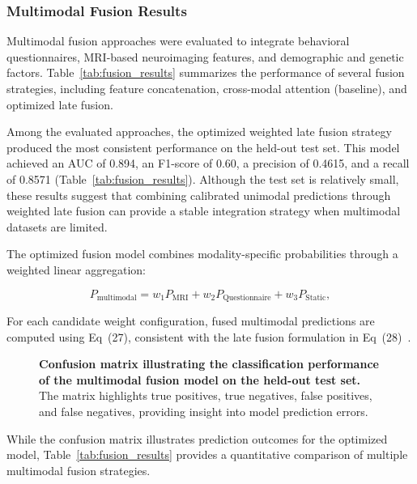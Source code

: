 \documentclass[10pt,letterpaper]{article}
\begin{document}
\subsubsection*{Multimodal Fusion Results}

Multimodal fusion approaches were evaluated to integrate behavioral
questionnaires, MRI-based neuroimaging features, and demographic and
genetic factors. Table~\ref{tab:fusion_results} summarizes the performance
of several fusion strategies, including feature concatenation,
cross-modal attention (baseline), and optimized late fusion.

Among the evaluated approaches, the optimized weighted late fusion
strategy produced the most consistent performance on the held-out
test set. This model achieved an AUC of 0.894, an F1-score of 0.60,
a precision of 0.4615, and a recall of 0.8571 (Table~\ref{tab:fusion_results}).
Although the test set is relatively small, these results suggest that
combining calibrated unimodal predictions through weighted late fusion
can provide a stable integration strategy when multimodal datasets are
limited.

The optimized fusion model combines modality-specific probabilities
through a weighted linear aggregation:

\begin{equation}
P_{\text{multimodal}} = w_1 P_{\text{MRI}} + w_2 P_{\text{Questionnaire}} + w_3 P_{\text{Static}},
\end{equation}

For each candidate weight configuration, fused multimodal predictions are computed using Eq~(27), consistent with the late fusion formulation in Eq~(28)~\cite{ref59}. 

\begin{figure}[!h]
\caption{\textbf{Confusion matrix illustrating the classification performance of the multimodal fusion model on the held-out test set.}
The matrix highlights true positives, true negatives, false positives, and false negatives, providing insight into model prediction errors.}
\label{fig:confusion_matrix}
\end{figure}

While the confusion matrix illustrates prediction outcomes for the optimized model, Table~\ref{tab:fusion_results} provides a quantitative comparison of multiple multimodal fusion strategies.
\end{document}
